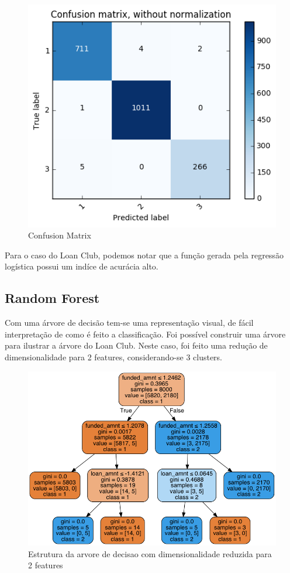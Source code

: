 \begin{figure}[!ht]
\caption{Confusion Matrix}
\centerline{\includegraphics[width=.6\textwidth]{img/confusionMatrix}}
\end{figure}


Para o caso do Loan Club, podemos notar que a função gerada pela regressão logística possui um indíce de acurácia alto.

\subsection{Random Forest}


Com uma árvore de decisão tem-se uma representação visual, de fácil interpretação de como é feito a classificação. Foi possível construir uma árvore para ilustrar a árvore do Loan Club. Neste caso, foi feito uma redução de dimensionalidade para 2 features, considerando-se 3 clusters.

\begin{figure}[!ht]
\caption{Estrutura da arvore de decisao com dimensionalidade reduzida para 2 features}
\centerline{\includegraphics[width=1.05\textwidth]{img/loan}}
\end{figure}

